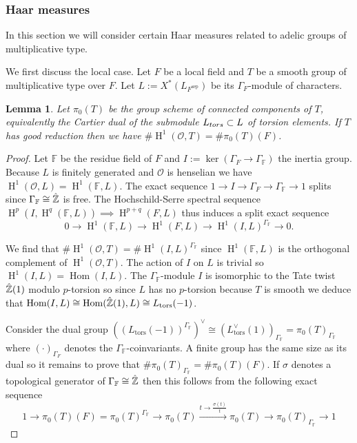 \documentclass[a4paper,11pt,reqno]{amsart}
\newcommand{\F}{\mathbb{F}}
\DeclareMathOperator{\Hom}{Hom}
\DeclareMathOperator{\HH}{H}
\DeclareMathOperator{\sep}{sep}
\newtheorem{lemma}[theorem]{Lemma}
\theoremstyle{definition}
\begin{document}
\subsubsection{Haar measures}
In this section we will consider certain Haar measures related to adelic groups of multiplicative type.

We first discuss the local case. Let $F$ be a local field and $T$ be a smooth group of multiplicative type over $F$. Let $L := X^*(L_{F^{\sep}})$ be its $\Gamma_F$-module of characters. 
\begin{lemma}\label{Number of integral torsors of group of multiplicative type with good reduction}
	Let $\pi_0(T)$ be the group scheme of connected components of $T$, equivalently the Cartier dual of the submodule $L_{\emph{tors}} \subset L$ of torsion elements. If $T$ has good reduction then we have $\# \HH^1(\mathcal{O}, T) = \# \pi_0(T)(F)$.
\end{lemma}
\begin{proof}
	Let $\F$ be the residue field of $F$ and $I := \ker(\Gamma_F \to \Gamma_{\F})$ the inertia group. Because $L$ is finitely generated and $\mathcal{O}$ is henselian we have $\HH^1(\mathcal{O}, L) = \HH^1(\F, L)$. The exact sequence $1 \to I \to \Gamma_F \to \Gamma_{\F} \to 1$ splits since $\Gamma_{\F} \cong \hat{\Z}$ is free. The Hochschild-Serre spectral sequence $\HH^p(I, \HH^q(\F, L)) \implies \HH^{p + q}(F, L)$ thus induces a split exact sequence
	\begin{equation*}
		0 \to \HH^1(\F, L) \to \HH^1(F, L) \to \HH^1(I, L)^{\Gamma_{\F}} \to 0.
	\end{equation*}
	
	We find that $\# \HH^1(\mathcal{O}, T) = \# \HH^1(I, L)^{\Gamma_{\F}}$ since $\HH^1(\F, L)$ is the orthogonal complement of $\HH^1(\mathcal{O}, T)$. The action of $I$ on $L$ is trivial so $\HH^1(I, L) = \Hom(I, L)$. The $\Gamma_{\F}$-module $I$ is isomorphic to the Tate twist $\hat{\mathbb{Z}}(1)$ modulo $p$-torsion so since $L$ has no $p$-torsion because $T$ is smooth we deduce that $\Hom(I, L) \cong \Hom(\hat{\Z}(1), L) \cong L_{\text{tors}}(-1)$.
	
	Consider the dual group $((L_{\text{tors}}(-1))^{\Gamma_{\F}})^{\vee} \cong (L_{\text{tors}}^{\vee}(1))_{\Gamma_{\F}} = \pi_{0}(T)_{\Gamma_{\F}}$ where $(\cdot)_{\Gamma_F}$ denotes the $\Gamma_{\F}$-coinvariants. A finite group has the same size as its dual so it remains to prove that $\# \pi_{0}(T)_{\Gamma_{\F}} = \# \pi_{0}(T)(F)$. If $\sigma$ denotes a topological generator of $\Gamma_{\F} \cong \hat{\Z}$ then this follows from the following exact sequence
	\begin{equation*}
		1 \to \pi_{0}(T)(F) = \pi_{0}(T)^{\Gamma_{\F}} \to \pi_0(T) \xrightarrow{t \to \frac{\sigma(t)}{t}} \pi_0(T) \to \pi_0(T)_{\Gamma_{\F}} \to 1
	\end{equation*}
\end{proof}
\end{document}
